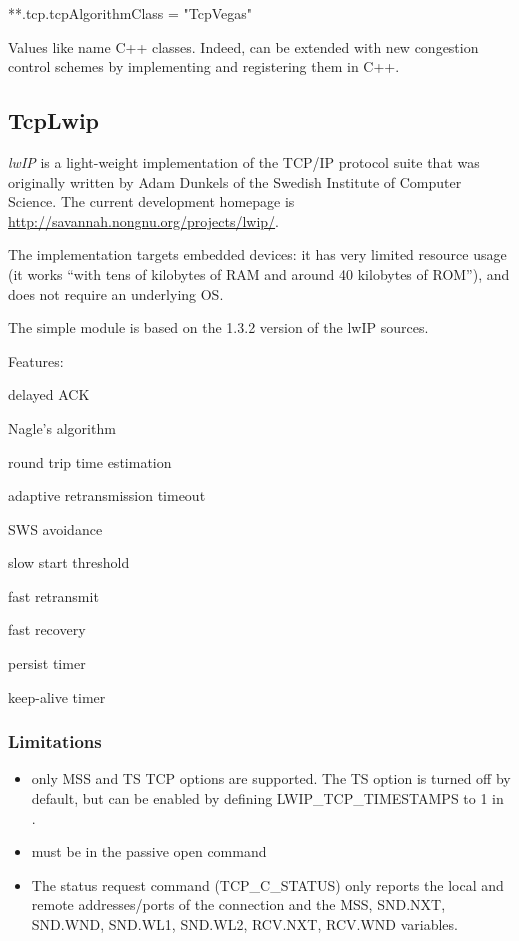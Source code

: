 \begin{inifile}
**.tcp.tcpAlgorithmClass = "TcpVegas"
\end{inifile}

Values like  name C++ classes. Indeed,  can be
extended with new congestion control schemes by implementing and registering
them in C++.



\subsection{TcpLwip}
\label{sec:tcp_lwip}

\textit{lwIP} is a light-weight implementation of the TCP/IP protocol suite
that was originally written by Adam Dunkels of the Swedish Institute of
Computer Science. The current development homepage is
\url{http://savannah.nongnu.org/projects/lwip/}.

The implementation targets embedded devices: it has very limited resource usage
(it works ``with tens of kilobytes of RAM and around 40 kilobytes of ROM''), and
does not require an underlying OS.

The  simple module is based on the 1.3.2 version of
the lwIP sources.

Features:

\begin{compactitem}
\item delayed ACK
\item Nagle's algorithm
\item round trip time estimation
\item adaptive retransmission timeout
\item SWS avoidance
\item slow start threshold
\item fast retransmit
\item fast recovery
\item persist timer
\item keep-alive timer
\end{compactitem}

\subsubsection*{Limitations}

\begin{itemize}
  \item only MSS and TS TCP options are supported. The TS option is turned off
        by default, but can be enabled by defining LWIP\_TCP\_TIMESTAMPS to 1
        in .
  \item {} must be  in the passive open command
  \item The status request command (TCP\_C\_STATUS) only reports the
          local and remote addresses/ports of the connection and
          the MSS, SND.NXT, SND.WND, SND.WL1, SND.WL2, RCV.NXT, RCV.WND variables.
\end{itemize}

